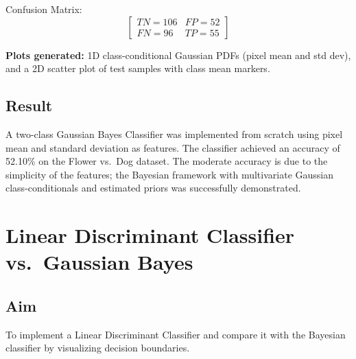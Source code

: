 \documentclass[12pt,a4paper]{article}
\begin{document}
\noindent Confusion Matrix:
\[
\begin{bmatrix} TN = 106 & FP = 52 \\ FN = 96 & TP = 55 \end{bmatrix}
\]

\noindent \textbf{Plots generated:} 1D class-conditional Gaussian PDFs (pixel mean and std dev),
and a 2D scatter plot of test samples with class mean markers.

\subsection*{Result}
A two-class Gaussian Bayes Classifier was implemented from scratch using pixel mean and standard
deviation as features. The classifier achieved an accuracy of 52.10\% on the Flower vs.\ Dog dataset.
The moderate accuracy is due to the simplicity of the features; the Bayesian framework with
multivariate Gaussian class-conditionals and estimated priors was successfully demonstrated.

\newpage

\section{Linear Discriminant Classifier vs.\ Gaussian Bayes}

\subsection*{Aim}
To implement a Linear Discriminant Classifier and compare it with the Bayesian classifier by
visualizing decision boundaries.
\end{document}
